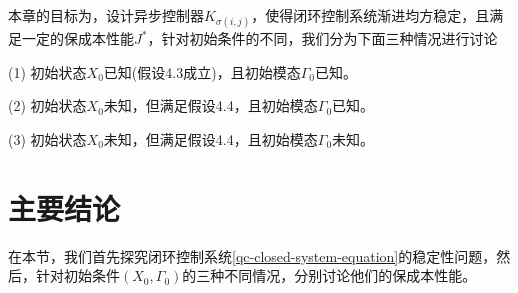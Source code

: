 	本章的目标为，设计异步控制器$K_{\sigma(i,j)}$，使得闭环控制系统渐进均方稳定，且满足一定的保成本性能$J^{*}$，针对初始条件的不同，我们分为下面三种情况进行讨论
	
	(1) 初始状态$X_{0}$已知(假设4.3成立)，且初始模态$\varGamma_{0}$已知。
	
	(2) 初始状态$X_{0}$未知，但满足假设4.4，且初始模态$\varGamma_{0}$已知。
	
	(3) 初始状态$X_{0}$未知，但满足假设4.4，且初始模态$\varGamma_{0}$未知。
	

\section{主要结论}
	在本节，我们首先探究闭环控制系统\eqref{qc-closed-system-equation}的稳定性问题，然后，针对初始条件$(X_{0}, \varGamma_{0})$的三种不同情况，分别讨论他们的保成本性能。
	
